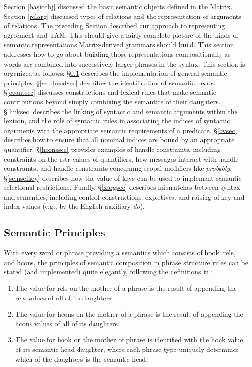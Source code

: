 \documentclass[12pt]{article}
\begin{document}
Section \ref{basicobj} discussed the basic semantic objects defined
in the Matrix.  Section \ref{relarg} discussed types of relations
and the representation of arguments of relations.  The preceding
Section described our approach to representing agreement and TAM.
This should give a fairly complete picture of the kinds of semantic
representations Matrix-derived grammars should build.  This section
addresses how to go about building those representations
compositionally as words are combined into successively larger phrases
in the syntax.  This section is organized as follows:
\S\ref{semprinsec} describes the implementation of general semantic
principles. \S\ref{semheadsec} describes the identification of
semantic heads.  \S\ref{ccontsec} discusses constructions and lexical
rules that make semantic contributions beyond simply combining the
semantics of their daughters.  \S\ref{linksec} describes the linking
of syntactic and semantic arguments within the lexicon, and the
role of syntactic rules in associating the indices of syntactic
arguments with the appropriate semantic requirements of a predicate.
\S\ref{bvsec} describes how to ensure that all nominal indices are
bound by an appropriate quantifier.  \S\ref{hconssec} provides
examples of handle constraints, including constraints on the {\sc
rstr} values of quantifiers, how messages interact with handle
constraints, and handle constraints concerning scopal modifiers like
{\it probably}.  \S\ref{semselkey} describes how the value of {\sc
keys} can be used to implement semantic selectional restrictions.
Finally, \S\ref{xargsec} describes mismatches between syntax and
semantics, including control constructions, expletives, and
raising of {\sc key} and {\sc index} values (e.g., by the English auxiliary 
{\it do}).

\subsection{Semantic Principles}
\label{semprinsec}

With every word or phrase providing a semantics which consists of {\sc
hook}, {\sc rels}, and {\sc hcons}, the principles of semantic
composition in phrase structure rules can be stated (and implemented)
quite elegantly, following the definitions in :

\begin{enumerate}
\item The value for {\sc rels} on the mother of a phrase is the result of
appending the {\sc rels} values of all of its daughters.
\item The value for {\sc hcons} on the mother of a phrase is the result of
appending the {\sc hcons} values of all of its daughters.
\item The value for {\sc hook} on the mother of phrase is identified with
the {\sc hook} value of its semantic head daughter, where each phrase type
uniquely determines which of the daughters is the semantic head.
\end{enumerate}
\end{document}
